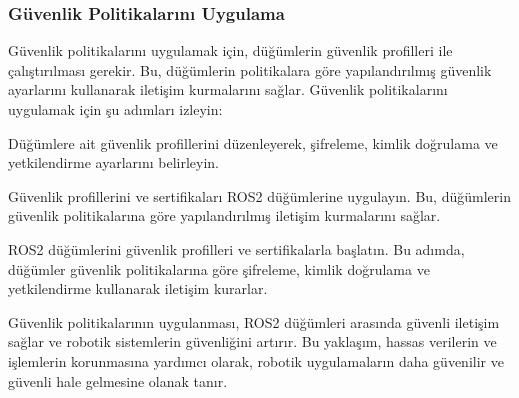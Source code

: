 \subsubsection{Güvenlik Politikalarını Uygulama}
Güvenlik politikalarını uygulamak için, düğümlerin güvenlik profilleri ile çalıştırılması gerekir. Bu, düğümlerin politikalara göre yapılandırılmış güvenlik ayarlarını kullanarak iletişim kurmalarını sağlar. Güvenlik politikalarını uygulamak için şu adımları izleyin:

Düğümlere ait güvenlik profillerini düzenleyerek, şifreleme, kimlik doğrulama ve yetkilendirme ayarlarını belirleyin.

Güvenlik profillerini ve sertifikaları ROS2 düğümlerine uygulayın. Bu, düğümlerin güvenlik politikalarına göre yapılandırılmış iletişim kurmalarını sağlar.

ROS2 düğümlerini güvenlik profilleri ve sertifikalarla başlatın. Bu adımda, düğümler güvenlik politikalarına göre şifreleme, kimlik doğrulama ve yetkilendirme kullanarak iletişim kurarlar.

Güvenlik politikalarının uygulanması, ROS2 düğümleri arasında güvenli iletişim sağlar ve robotik sistemlerin güvenliğini artırır. Bu yaklaşım, hassas verilerin ve işlemlerin korunmasına yardımcı olarak, robotik uygulamaların daha güvenilir ve güvenli hale gelmesine olanak tanır.
